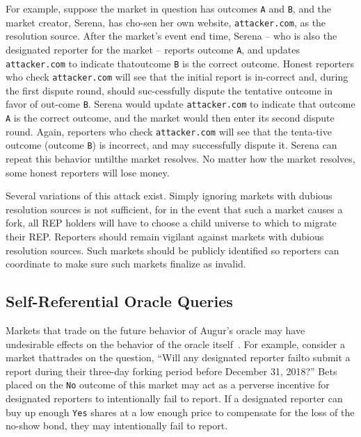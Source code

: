 \documentclass[12pt,floatfix,reprint,nofootinbib,amsmath,amssymb,epsfig,pre,floats,letterpaper,groupedaffiliation]{revtex4-1}
\theoremstyle{definition}
\theoremstyle{definition}
\begin{document}
For example, suppose the market in question has outcomes \texttt{A} and \texttt{B}, and the market creator, Serena, has cho-\linebreak sen her own website, \texttt{attacker.com}, as the resolution source. After the market's event end time, Serena -- who is also the designated reporter for the market -- reports outcome \texttt{A}, and updates \texttt{attacker.com} to indicate that\linebreak outcome \texttt{B} is the correct outcome. Honest reporters who check \texttt{attacker.com} will see that the initial report is in-\linebreak correct and, during the first dispute round, should suc-\linebreak cessfully dispute the tentative outcome in favor of out-\linebreak come \texttt{B}. Serena would update \texttt{attacker.com} to indicate that outcome \texttt{A} is the correct outcome, and the market would then enter its second dispute round. Again, reporters who check \texttt{attacker.com} will see that the tenta-\linebreak tive outcome (outcome \texttt{B}) is incorrect, and may successfully dispute it. Serena can repeat this behavior until\linebreak the market resolves. No matter how the market resolves, some honest reporters will lose money.

Several variations of this attack exist. Simply ignoring markets with dubious resolution sources is not sufficient, for in the event that such a market causes a fork, all REP holders will have to choose a child universe to which to migrate their REP. Reporters should remain vigilant against markets with dubious resolution sources. Such markets should be publicly identified so reporters can coordinate to make sure such markets finalize as invalid.

\subsection{Self-Referential Oracle Queries}

Markets that trade on the future behavior of Augur's oracle may have undesirable effects on the behavior of the oracle itself~\cite{Othman_2010}. For example, consider a market that\linebreak trades on the question, ``Will any designated reporter fail\linebreak to submit a report during their three-day forking period before December 31, 2018?'' Bets placed on the \texttt{No} outcome of this market may act as a perverse incentive for designated reporters to intentionally fail to report. If a designated reporter can buy up enough \texttt{Yes} shares at a low enough price to compensate for the loss of the no-\linebreak show bond, they may intentionally fail to report.
\end{document}
